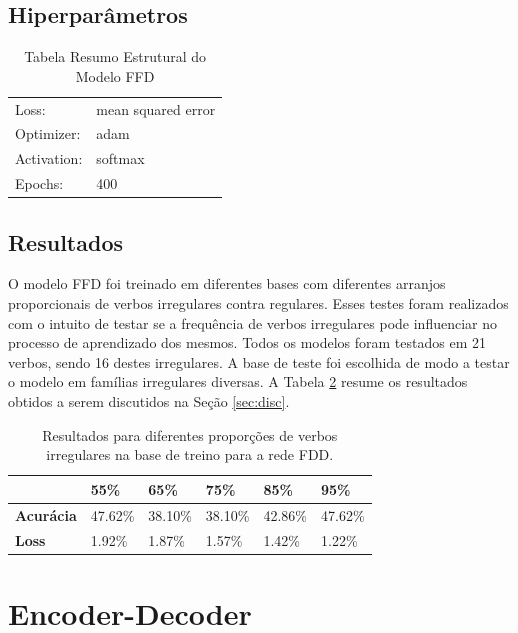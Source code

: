 \subsection{Hiperparâmetros}

\begin{table}[H]
\centering
\begin{tabular}{ll}
Loss: & mean squared error \\
Optimizer: & adam \\
Activation: & softmax \\
Epochs: & 400 \\
\end{tabular}
\caption{Tabela Resumo Estrutural do Modelo FFD}
\label{tab:res1}
\end{table}

\subsection{Resultados}

O modelo FFD foi treinado em diferentes bases com diferentes arranjos proporcionais de verbos irregulares contra regulares. Esses testes foram realizados com o intuito de testar se a frequência de verbos irregulares pode influenciar no processo de aprendizado dos mesmos. Todos os modelos foram testados em 21 verbos, sendo 16 destes irregulares. A base de teste foi escolhida de modo a testar o modelo em famílias irregulares diversas. A Tabela \ref{tab:resultadosfdd} resume os resultados obtidos a serem discutidos na Seção \ref{sec:disc}.

\begin{table}[H]
\centering
\begin{tabular}{llllll}
 & \textbf{55\%} & \textbf{65\%} & \textbf{75\%} & \textbf{85\%} & \textbf{95\%} \\ \hline
\textbf{Acurácia} & 47.62\% & 38.10\% & 38.10\% & 42.86\% & 47.62\% \\
\textbf{Loss} & 1.92\% & 1.87\% & 1.57\% & 1.42\% & 1.22\%
\end{tabular}
\caption{Resultados para diferentes proporções de verbos irregulares na base de treino para a rede FDD.}
\label{tab:resultadosfdd}
\end{table}

\section{Encoder-Decoder}
\label{sec:seq2seq}


